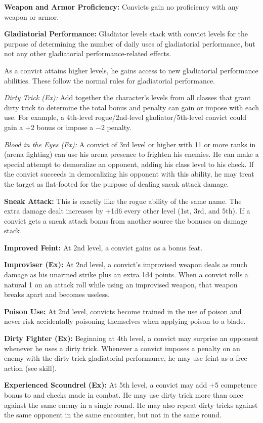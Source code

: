 {
\textbf{Weapon and Armor Proficiency:} Convicts gain no proficiency with any weapon or armor.

\textbf{Gladiatorial Performance:} Gladiator levels stack with convict levels for the purpose of determining the number of daily uses of gladiatorial performance, but not any other gladiatorial performance-related effects.

As a convict attains higher levels, he gains access to new gladiatorial performance abilities. These follow the normal rules for gladiatorial performance.

\textit{Dirty Trick (Ex):} Add together the character's levels from all classes that grant dirty trick to determine the total bonus and penalty can gain or impose with each use. For example, a 4th-level rogue/2nd-level gladiator/5th-level convict could gain a +2 bonus or impose a $-2$ penalty.

\textit{Blood in the Eyes (Ex):} A convict of 3rd level or higher with 11 or more ranks in  (arena fighting) can use his arena presence to frighten his enemies. He can make a special attempt to demoralize an opponent, adding his class level to his  check. If the convict succeeds in demoralizing his opponent with this ability, he may treat the target as flat-footed for the purpose of dealing sneak attack damage.

\textbf{Sneak Attack:} This is exactly like the rogue ability of the same name. The extra damage dealt increases by +1d6 every other level (1st, 3rd, and 5th). If a convict gets a sneak attack bonus from another source the bonuses on damage stack.

\textbf{Improved Feint:} At 2nd level, a convict gains  as a bonus feat.

\textbf{Improviser (Ex):} At 2nd level, a convict's improvised weapon deals as much damage as his unarmed strike plus an extra 1d4 points. When a convict rolls a natural 1 on an attack roll while using an improvised weapon, that weapon breaks apart and becomes useless.

\textbf{Poison Use:} At 2nd level, convicts become trained in the use of poison and never risk accidentally poisoning themselves when applying poison to a blade.

\textbf{Dirty Fighter (Ex):} Beginning at 4th level, a convict may surprise an opponent whenever he uses a dirty trick. Whenever a convict imposes a penalty on an enemy with the dirty trick gladiatorial performance, he may use feint as a free action (see  skill).

\textbf{Experienced Scoundrel (Ex):} At 5th level, a convict may add +5 competence bonus to  and  checks made in combat. He may use dirty trick more than once against the same enemy in a single round. He may also repeat dirty tricks against the same opponent in the same encounter, but not in the same round.

}